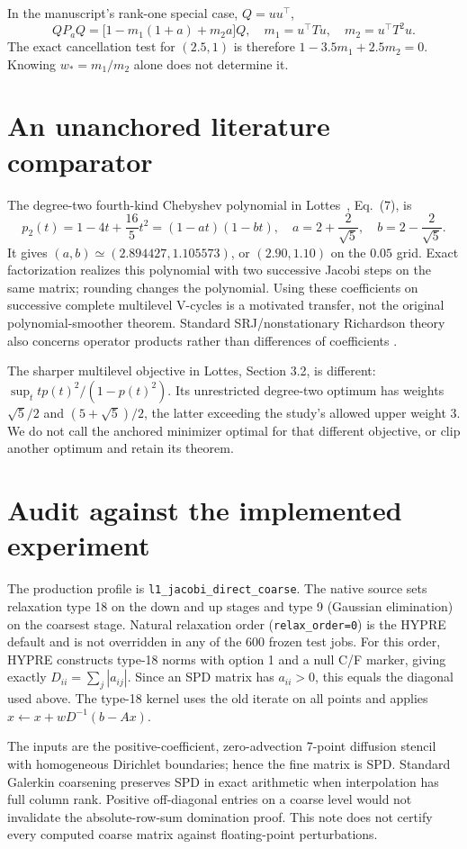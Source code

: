 \documentclass[11pt]{article}
\begin{document}
In the manuscript's rank-one special case, $Q=uu^\top$,
\[
 QP_aQ=
 \big[1-m_1(1+a)+m_2a\big]Q,\quad
 m_1=u^\top Tu,\quad m_2=u^\top T^2u.
\]
The exact cancellation test for $(2.5,1)$ is therefore
$1-3.5m_1+2.5m_2=0$. Knowing $w_*=m_1/m_2$ alone does not determine it.

\section{An unanchored literature comparator}
The degree-two fourth-kind Chebyshev polynomial in Lottes~\cite{lottes},
Eq.~(7), is
\[
 p_2(t)=1-4t+\frac{16}{5}t^2
       =(1-at)(1-bt),
\quad
 a=2+\frac2{\sqrt5},\quad b=2-\frac2{\sqrt5}.
\]
It gives $(a,b)\simeq(2.894427,1.105573)$, or $(2.90,1.10)$ on the
$0.05$ grid. Exact factorization realizes this polynomial with two
successive Jacobi steps on the same matrix; rounding changes the
polynomial. Using these coefficients on successive complete multilevel
V-cycles is a motivated transfer, not the original polynomial-smoother
theorem. Standard SRJ/nonstationary Richardson theory also concerns
operator products rather than differences of coefficients
\cite{yang,adsuara}.

The sharper multilevel objective in Lottes, Section 3.2, is different:
$\sup_t t p(t)^2/(1-p(t)^2)$. Its unrestricted degree-two optimum
has weights $\sqrt5/2$ and $(5+\sqrt5)/2$, the latter exceeding the
study's allowed upper weight 3. We do not call the anchored minimizer
optimal for that different objective, or clip another optimum and
retain its theorem.

\section{Audit against the implemented experiment}
The production profile is \texttt{l1\_jacobi\_direct\_coarse}. The native
source sets relaxation type 18 on the down and up stages and type 9
(Gaussian elimination) on the coarsest stage. Natural relaxation order
(\texttt{relax\_order=0}) is the HYPRE default and is not overridden in
any of the 600 frozen test jobs. For this order, HYPRE constructs type-18
norms with option 1 and a null C/F marker, giving exactly
$D_{ii}=\sum_j|a_{ij}|$. Since an SPD matrix has $a_{ii}>0$, this equals
the diagonal used above. The type-18 kernel uses the old iterate on all
points and applies $x\leftarrow x+wD^{-1}(b-Ax)$.

The inputs are the positive-coefficient, zero-advection 7-point diffusion
stencil with homogeneous Dirichlet boundaries; hence the fine matrix is
SPD. Standard Galerkin coarsening preserves SPD in exact arithmetic when
interpolation has full column rank. Positive off-diagonal entries on a
coarse level would not invalidate the absolute-row-sum domination proof.
This note does not certify every computed coarse matrix against
floating-point perturbations.
\end{document}

